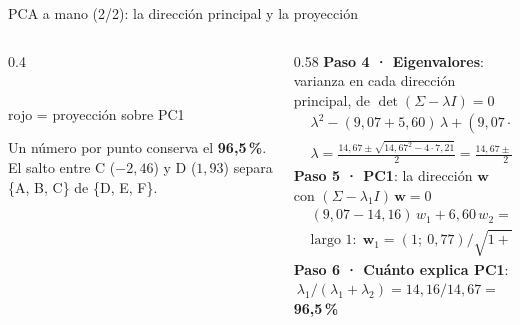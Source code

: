 \documentclass[aspectratio=169,12pt]{beamer}
\begin{document}
\begin{frame}{PCA a mano (2/2): la dirección principal y la proyección}
  \setlength{\abovedisplayskip}{2pt}\setlength{\belowdisplayskip}{2pt}
  \setlength{\abovedisplayshortskip}{1pt}\setlength{\belowdisplayshortskip}{2pt}
  \begin{columns}[T]
    \begin{column}{0.4\textwidth}
      \centering
      \\
      {\tiny rojo = proyección sobre PC1}\\[4pt]
      {\scriptsize\raggedright Un número por punto conserva el \textbf{96,5\,\%}. El salto entre C ($-2{,}46$) y D ($1{,}93$) separa \{A, B, C\} de \{D, E, F\}.\par}
    \end{column}
    \begin{column}{0.58\textwidth}
      \scriptsize
      \textbf{Paso 4 · Eigenvalores}: varianza en cada dirección principal, de $\det(\Sigma - \lambda I) = 0$
      \[ \begin{aligned}
        &\lambda^2 - (9{,}07+5{,}60)\,\lambda + (9{,}07\cdot5{,}60 - 6{,}60^2) = \lambda^2 - 14{,}67\,\lambda + 7{,}21 = 0\\
        &\lambda = \tfrac{14{,}67 \pm \sqrt{14{,}67^2 - 4 \cdot 7{,}21}}{2} = \tfrac{14{,}67 \pm 13{,}65}{2}
         \;\Rightarrow\; \lambda_1 = 14{,}16,\quad \lambda_2 = 0{,}51
      \end{aligned} \]
      \textbf{Paso 5 · PC1}: la dirección $\mathbf w$ con $(\Sigma - \lambda_1 I)\,\mathbf w = 0$
      \[ \begin{aligned}
        &(9{,}07 - 14{,}16)\,w_1 + 6{,}60\,w_2 = 0 \;\Rightarrow\; w_2 = 0{,}77\,w_1\\
        &\text{largo 1:}\ \ \mathbf w_1 = (1;\ 0{,}77) / \sqrt{1+0{,}77^2} \approx (0{,}79;\ 0{,}61)
      \end{aligned} \]
      \textbf{Paso 6 · Cuánto explica PC1}: $\ \lambda_1 / (\lambda_1+\lambda_2) = 14{,}16 / 14{,}67 =$ \textbf{96,5\,\%}\par
      \vspace{3pt}


\end{column}
\end{columns}
\end{frame}
\end{document}
